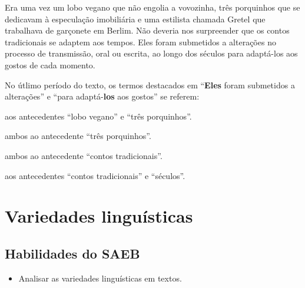 {\begin{myquote}

Era uma vez um lobo vegano que não engolia a vovozinha, três
porquinhos que se dedicavam à especulação imobiliária e uma estilista
chamada Gretel que trabalhava de garçonete em Berlim. Não deveria nos
surpreender que os contos tradicionais se adaptem aos tempos. Eles foram
submetidos a alterações no processo de transmissão, oral ou escrita, ao
longo dos séculos para adaptá-los aos gostos de cada momento.

\end{myquote}



No útlimo período do texto, os termos destacados em ``\textbf{Eles} foram
submetidos a alterações'' e ``para adaptá-\textbf{los} aos gostos'' se referem:

\begin{escolha}

  \item aos antecedentes ``lobo vegano'' e ``três porquinhos''.

  \item ambos ao antecedente ``três porquinhos''. 

  \item ambos ao antecedente ``contos tradicionais''.

  \item aos antecedentes ``contos tradicionais'' e ``séculos''.

\end{escolha}


\chapter{Variedades linguísticas}

\section{Habilidades do SAEB}

\begin{itemize}

  \item Analisar as variedades linguísticas em textos.


\end{itemize}}
